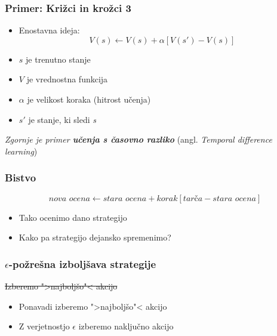 \documentclass{beamer}    %
\begin{document}
\begin{frame}
    \frametitle{Primer: Križci in krožci 3}
    \begin{itemize}
        \item Enostavna ideja:                                  
        $$
        V(s) \leftarrow V(s) + \alpha [V(s') - V(s)]
        $$
        \pause
        \item $s$ je trenutno stanje                     
        \pause
        \item $V$ je vrednostna funkcija                 
        \pause
        \item $\alpha$ je velikost koraka (hitrost učenja) 
        \pause
        \item $s'$ je stanje, ki sledi \textit{s}   
    \end{itemize}
    \medskip
    \emph{Zgornje je primer \textbf{učenja s časovno razliko}} (angl. \textit{Temporal difference learning})
\end{frame}


\begin{frame}
    \frametitle{Bistvo}
    $$
    \textit{nova ocena} \leftarrow \textit{stara ocena} + \textit{korak} 
    [\textit{tarča} - \textit{stara ocena}]
    $$
    \medskip
    \begin{itemize}
        \item Tako ocenimo dano strategijo
        \item Kako pa strategijo dejansko spremenimo?
    \end{itemize}
\end{frame}


\begin{frame}
    \frametitle{$\epsilon$-požrešna izboljšava strategije}
    \pause
    \sout{Izberemo ">najboljšo"< akcijo}
    \pause
    \medskip

    \begin{itemize}
        \item Ponavadi izberemo ">najboljšo"< akcijo
        \item Z verjetnostjo $\epsilon$ izberemo naključno akcijo
    \end{itemize}
\end{frame}
\end{document}
